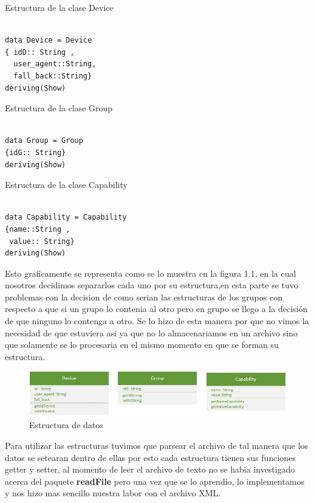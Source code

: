 \documentclass[a4paper,openright,12pt]{report}
\begin{document}
\lstset{language=Haskell}          %
Estructura de la clase Device
\begin{lstlisting}[frame=single]  % Start your code-block

data Device = Device 
{ idD:: String ,	
  user_agent::String,	
  fall_back::String}
deriving(Show)
\end{lstlisting}
Estructura de la clase Group
\begin{lstlisting}[frame=single]  % Start your code-block

data Group = Group 
{idG:: String}
deriving(Show)
\end{lstlisting}
Estructura de la clase Capability
\begin{lstlisting}[frame=single]  % Start your code-block

data Capability = Capability 
{name::String ,
 value:: String}
deriving(Show)
\end{lstlisting}

Esto graficamente se representa como se lo muestra en la figura 1.1, en la cual nosotros decidimos separarlos cada uno por su estructura,en esta parte se tuvo problemas con la decision de como serian las estructuras de los grupos con respecto a que si un grupo lo contenia al otro pero en grupo se llego a la decisión de que ninguno lo contenga a otro. Se lo hizo de esta manera por que no vimos la necesidad de que estuviera asi ya que no lo almacenariamos en un archivo sino que solamente se lo procesaria en el mismo momento en que se forman su estructura.\\
\begin{figure}[htbp]
	\begin{center}
		\includegraphics[width=.90\textwidth]{./imagenes/estructuras.jpg}
		\caption{Estructura de datos}
		\label{Estructura de datos}
	\end{center}
\end{figure}

Para utilizar las estructuras tuvimos que parsear el archivo de tal manera que los datos se setearan dentro de ellas por esto cada estructura tienen sus funciones getter y setter, al momento de leer el archivo de texto no se habia investigado acerca del paquete \textbf{readFile} pero una vez que se lo aprendio, lo implementamos y nos hizo mas sencillo nuestra labor con el archivo XML.\\
\end{document}
